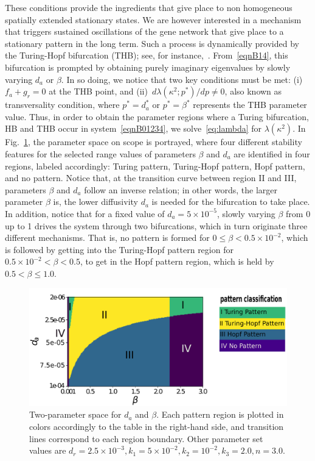 \documentclass[%
 preprint,
 aip, 
 amsmath,amssymb,
]{revtex4-2}
\begin{document}
These conditions provide the ingredients that give place to non homogeneous spatially extended stationary states. We are however interested in a mechanism that triggers sustained oscillations of the gene network that give place to a stationary pattern in the long term. Such a process is dynamically provided by the Turing-Hopf bifurcation (THB); see, for instance,~\cite{Castillo2016, liu}. From~\eqref{eqnB14}, this bifurcation is prompted by obtaining purely imaginary eigenvalues by slowly varying $d_a$ or $\beta$. In so doing, we notice that two key conditions must be met: (i)~$f_a + g_r=0$ at the THB point, and (ii)~$d\lambda(\kappa^2;p^*)/dp\neq0$, also known as transversality condition, where $p^*=d_a^*$ or $p^*=\beta^*$ represents the THB parameter value. Thus, in order to obtain the parameter regions where a Turing bifurcation, HB and THB occur in system~\eqref{eqnB01234}, we solve~\eqref{eq:lambda} for $\lambda(\kappa^2)$. In Fig.~\ref{FigB01}, the parameter space on scope is portrayed, where four different stability features for the selected range values of parameters $\beta$ and $d_a$ are identified in four regions, labeled accordingly: Turing pattern, Turing-Hopf pattern, Hopf pattern, and no pattern. Notice that, at the transition curve between region II and III, parameters $\beta$ and $d_a$ follow an inverse relation; in other words, the larger parameter $\beta$ is, the lower diffusivity $d_a$ is needed for the bifurcation to take place. In addition, notice that for a fixed value of $d_a=5\times10^{-5}$, slowly varying $\beta$ from 0 up to 1 drives the system through two bifurcations, which in turn originate three different mechanisms. That is, no pattern is formed for $0\leq\beta < 0.5\times10^{-2}$, which is followed by getting into the Turing-Hopf pattern region for $ 0.5\times10^{-2}<\beta<0.5$, to get in the Hopf pattern region, which is held by $ 0.5<\beta\leq 1.0$. 

\begin{figure}[t!]
	\centering
	\includegraphics[width=5.0in]{Figures/ApFigure01}
	\caption{Two-parameter space for $d_a$ and $\beta$. Each pattern region is plotted in colors accordingly to the table in the right-hand side, and transition lines correspond to each region boundary. Other parameter set values are $d_r = 2.5\times10^{-3}, k_1 = 5\times10^{-2}, k_2=10^{-2}, k_3=2.0, n=3.0$.}
	\label{FigB01}
\end{figure}
\end{document}
